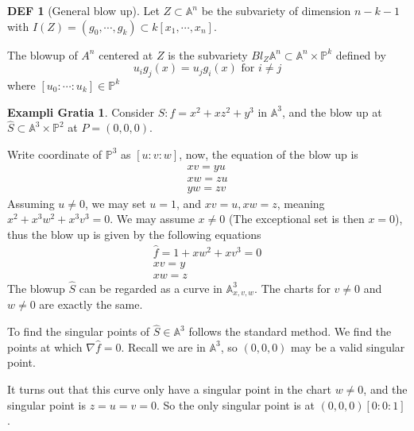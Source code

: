 \documentclass[twocolumn]{article}
\newcommand{\A}{\mathbb{A}}
\renewcommand{\P}{\mathbb{P}}
\theoremstyle{definition}
\newtheorem{example}[thm]{Exampli Gratia}
\newtheorem{defi}[thm]{DEF}
\theoremstyle{remark}
\begin{document}
\begin{defi}[General blow up]
	Let $Z \subset \A^n$ be the subvariety of dimension $n - k - 1$ with $I(Z) = (g_0, \cdots, g_k) \subset k[x_1, \cdots, x_n]$.

	The blowup of $A^n$ centered at $Z$ is the subvariety $Bl_Z \A^n \subset \A^n \times \P^k$ defined by 
	$$
	u_i g_j(x) = u_j g_i(x) \text{ for } i \neq j
	$$
	where $[u_0: \cdots : u_k] \in \P^k$
\end{defi}

\begin{example}
	Consider $S: f = x^2 + xz^2 + y^3$ in $\A^3$, and the blow up at $\hat{S}\subset \A^3 \times \P^2$ at $ P = (0,0,0) $. 

	Write coordinate of $\P^3$ as $[u:v:w]$, now, the equation of the blow up is 
	\begin{align*}
		xv = yu \\ 
		xw = zu \\ 
		yw = zv
	\end{align*}
	Assuming $u \neq 0$, we may set $u = 1$, and $xv = u, xw = z$, meaning
	$x^2 + x^3w^2 + x^3v^3 = 0$.
	We may assume $x \neq 0$ (The exceptional set is then $x = 0$), 
	thus the blow up is given by the following equations 
	\begin{align*}
		\hat{f} = 1 + xw^2 + xv^3 = 0 \\ 
		xv = y \\ 
		xw = z
	\end{align*}
	The blowup $\hat{S}$ can be regarded as a curve in $\A^3_{x, v, w}$.
	The charts for $v \neq 0$ and $w \neq 0$ are exactly the same.

	To find the singular points of $\hat{S} \in \A^3$ follows the standard method. 
	We find the points at which $\nabla \hat{f} = 0$. 
	Recall we are in $\A^3$, so $(0,0,0)$ may be a valid singular point.

	It turns out that this curve only have a singular point in the chart $w \neq 0$, and the singular point is $z = u = v = 0$. 
	So the only singular point is at $(0,0,0)[0:0:1]$.
\end{example}
\end{document}
